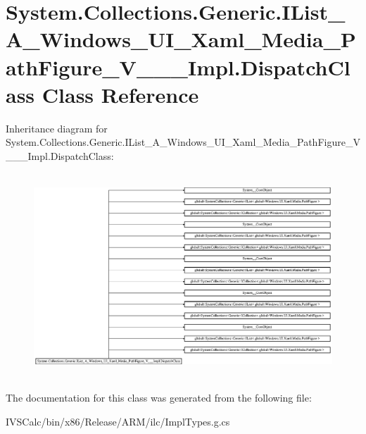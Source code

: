 \hypertarget{class_system_1_1_collections_1_1_generic_1_1_i_list___a___windows___u_i___xaml___media___path_fi2334ed481b1ab93c293b69873dc4d33f}{}\section{System.\+Collections.\+Generic.\+I\+List\+\_\+\+A\+\_\+\+Windows\+\_\+\+U\+I\+\_\+\+Xaml\+\_\+\+Media\+\_\+\+Path\+Figure\+\_\+\+V\+\_\+\+\_\+\+\_\+\+Impl.\+Dispatch\+Class Class Reference}
\label{class_system_1_1_collections_1_1_generic_1_1_i_list___a___windows___u_i___xaml___media___path_fi2334ed481b1ab93c293b69873dc4d33f}
Inheritance diagram for System.\+Collections.\+Generic.\+I\+List\+\_\+\+A\+\_\+\+Windows\+\_\+\+U\+I\+\_\+\+Xaml\+\_\+\+Media\+\_\+\+Path\+Figure\+\_\+\+V\+\_\+\+\_\+\+\_\+\+Impl.\+Dispatch\+Class\+:\begin{figure}[H]
\begin{center}
\leavevmode
\includegraphics[height=7.710843cm]{class_system_1_1_collections_1_1_generic_1_1_i_list___a___windows___u_i___xaml___media___path_fi2334ed481b1ab93c293b69873dc4d33f}
\end{center}
\end{figure}


The documentation for this class was generated from the following file\+:\begin{DoxyCompactItemize}
\item 
I\+V\+S\+Calc/bin/x86/\+Release/\+A\+R\+M/ilc/Impl\+Types.\+g.\+cs\end{DoxyCompactItemize}
